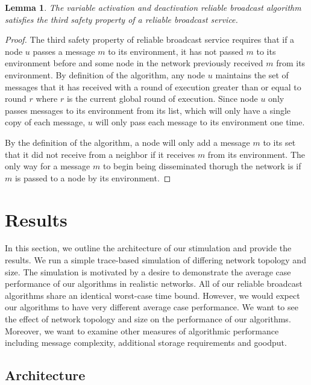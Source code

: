 \documentclass[english]{article}
\newtheorem{lemma}[theorem]{Lemma}
\begin{document}
\begin{lemma}
\label{DeactivationRBSafety3}
The variable activation and deactivation reliable broadcast algorithm satisfies the third safety property of a reliable broadcast service.
\end{lemma}
\begin{proof}

The third safety property of reliable broadcast service requires that if a node $u$ passes a message $m$ to its environment, it has not passed $m$ to its environment before and some node in the network previously received $m$ from its environment. By definition of the algorithm, any node $u$ maintains the set of messages that it has received with a round of execution greater than or equal to round $r$ where $r$ is the current global round of execution. Since node $u$ only passes messages to its environment from its list, which will only have a single copy of each message, $u$ will only pass each message to its environment one time. 

By the definition of the algorithm, a node will only add a message $m$ to its set that it did not receive from a neighbor if it receives $m$ from its environment. The only way for a message $m$ to begin being disseminated thorugh the network is if $m$ is passed to a node by its environment. 

\end{proof}



\section{Results}

In this section, we outline the architecture of our stimulation and provide the results. We run a simple trace-based simulation of differing network topology and size. The simulation is motivated by a desire to demonstrate the average case performance of our algorithms in realistic networks. All of our reliable broadcast algorithms share an identical worst-case time bound. However, we would expect our algorithms to have very different average case performance. We want to see the effect of network topology and size on the performance of our algorithms. Moreover, we want to examine other measures of algorithmic performance including message complexity, additional storage requirements and goodput.

\subsection{Architecture}
\end{document}
